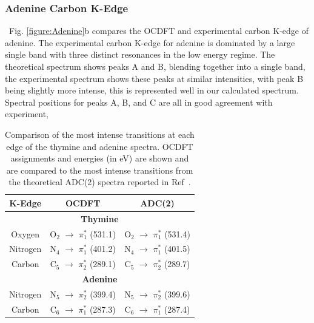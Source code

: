 \documentclass{article}
\begin{document}
\subsubsection{Adenine Carbon K-Edge}
\ Fig. \ref{figure:Adenine}b compares the OCDFT and experimental carbon K-edge of adenine. The experimental carbon K-edge for adenine is dominated by a large single band with three distinct resonances in the low energy regime. The theoretical spectrum shows peaks A and B, blending together into a single band, the experimental spectrum shows these peaks at similar intensities, with peak B being slightly more intense, this is represented well in our calculated spectrum. Spectral positions for peaks A, B, and C are all in good agreement with experiment, 
\begin{table}
\caption{Comparison of the most intense transitions at each edge of the thymine and adenine spectra. OCDFT assignments and energies (in eV) are shown and are compared to the most intense transitions from the theoretical ADC(2) spectra reported in Ref~.}
\small
\centering
\begin{tabular}{ccc}
\hline
\hline
K-Edge & OCDFT & ADC(2) \\
\hline
\multicolumn{3}{c}{\bf Thymine} \\
Oxygen  & O$_2$ $\rightarrow$ $\pi^*_1$ (531.1) &  O$_2$ $\rightarrow$ $\pi^*_1$ (531.4)  \\
Nitrogen  & N$_4$ $\rightarrow$ $\pi^*_1$ (401.2) & N$_4$ $\rightarrow$ $\pi^*_1$ (401.5) \\
Carbon  & C$_5$ $\rightarrow$ $\pi^*_2$ (289.1) & C$_5$ $\rightarrow$ $\pi^*_2$ (289.7) 
\\[2pt]
\multicolumn{3}{c}{\bf Adenine} \\
Nitrogen &  N$_5$ $\rightarrow$ $\pi^*_2$ (399.4) & N$_5$ $\rightarrow$ $\pi^*_2$ (399.6) \\
Carbon  & C$_6$ $\rightarrow$ $\pi^*_1$ (287.3) & C$_6$ $\rightarrow$ $\pi^*_1$ (287.4)\\[2pt]
\hline
\hline
\end{tabular}
\label{table: assignment_comparison}
\end{table}
\end{document}
